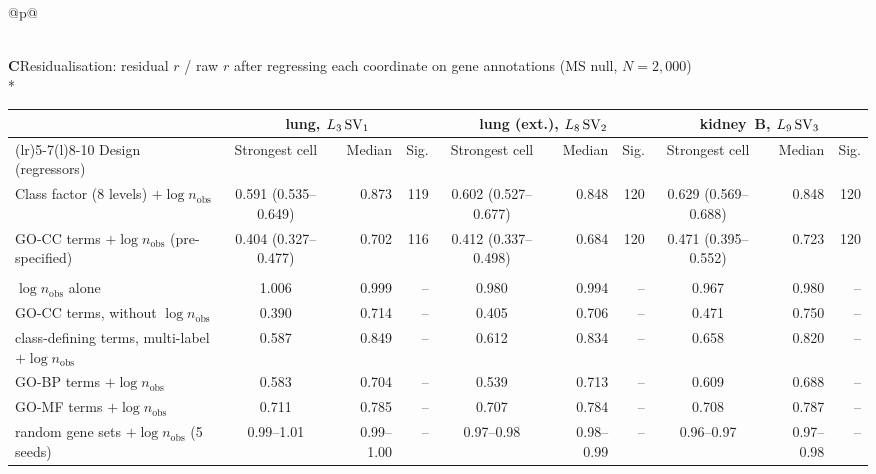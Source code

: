 \begin{longtable}{@{}p{\textwidth}@{}}
{}\\
\midrule
\textbf{C}\enspace Residualisation: residual $r$ / raw $r$ after regressing each coordinate on gene annotations (MS null, $N = 2{,}000$)\\*
{\scriptsize\setlength{\tabcolsep}{2.5pt}\begin{tabular*}{\textwidth}{@{\extracolsep{\fill}}>{\raggedright\arraybackslash}p{3.5cm}crrcrrcrr@{}}
& \multicolumn{3}{c}{lung, $L_3\,\mathrm{SV}_{1}$} & \multicolumn{3}{c}{lung (ext.), $L_8\,\mathrm{SV}_{2}$} & \multicolumn{3}{c}{kidney~B, $L_9\,\mathrm{SV}_{3}$} \\
\cmidrule(lr){2-4}\cmidrule(lr){5-7}\cmidrule(l){8-10}
Design (regressors) & Strongest cell & Median & Sig. & Strongest cell & Median & Sig. & Strongest cell & Median & Sig. \\
\midrule
Class factor (8 levels) $+ \log n_{\mathrm{obs}}$ & 0.591 (0.535--0.649) & 0.873 & 119 & 0.602 (0.527--0.677) & 0.848 & 120 & 0.629 (0.569--0.688) & 0.848 & 120 \\
30 GO-CC terms $+ \log n_{\mathrm{obs}}$ (pre-specified) & 0.404 (0.327--0.477) & 0.702 & 116 & 0.412 (0.337--0.498) & 0.684 & 120 & 0.471 (0.395--0.552) & 0.723 & 120 \\
\multicolumn{10}{@{}l}{\itshape Post hoc controls (no test)}\\
$\log n_{\mathrm{obs}}$ alone & 1.006 & 0.999 & -- & 0.980 & 0.994 & -- & 0.967 & 0.980 & -- \\
30 GO-CC terms, without $\log n_{\mathrm{obs}}$ & 0.390 & 0.714 & -- & 0.405 & 0.706 & -- & 0.471 & 0.750 & -- \\
8 class-defining terms, multi-label $+ \log n_{\mathrm{obs}}$ & 0.587 & 0.849 & -- & 0.612 & 0.834 & -- & 0.658 & 0.820 & -- \\
30 GO-BP terms $+ \log n_{\mathrm{obs}}$ & 0.583 & 0.704 & -- & 0.539 & 0.713 & -- & 0.609 & 0.688 & -- \\
30 GO-MF terms $+ \log n_{\mathrm{obs}}$ & 0.711 & 0.785 & -- & 0.707 & 0.784 & -- & 0.708 & 0.787 & -- \\
30 random gene sets $+ \log n_{\mathrm{obs}}$ (5 seeds) & 0.99--1.01 & 0.99--1.00 & -- & 0.97--0.98 & 0.98--0.99 & -- & 0.96--0.97 & 0.97--0.98 & -- \\

\end{tabular*}}
\end{longtable}
